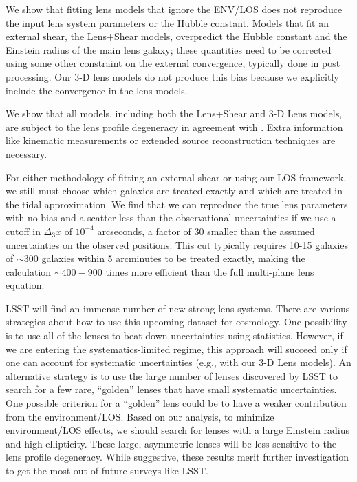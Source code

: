 \documentclass{emulateapj}
\begin{document}
We show that fitting lens models that ignore the ENV/LOS does not reproduce the input lens system parameters or the Hubble constant. Models that fit an external shear, the Lens+Shear models, overpredict the Hubble constant and the Einstein radius of the main lens galaxy; these quantities need to be corrected using some other constraint on the external convergence, typically done in post processing. Our 3-D lens models do not produce this bias because we explicitly include the convergence in the lens models.

We show that all models, including both the Lens+Shear and 3-D Lens models, are subject to the lens profile degeneracy in agreement with \citet{Xu15,Schneider13}. Extra information like kinematic measurements or extended source reconstruction techniques are necessary.

For either methodology of fitting an external shear or using our LOS framework, we still must choose which galaxies are treated exactly and which are treated in the tidal approximation. We find that we can reproduce the true lens parameters with no bias and a scatter less than the observational uncertainties if we use a cutoff in $\Delta_3 x$ of $10^{-4}$ arcseconds, a factor of 30 smaller than the assumed uncertainties on the observed positions. This cut typically requires 10-15 galaxies of $\sim 300$ galaxies within 5 arcminutes to be treated exactly, making the calculation $\sim 400-900$ times more efficient than the full multi-plane lens equation.

LSST will find an immense number of new strong lens systems. There are various strategies about how to use this upcoming dataset for cosmology. One possibility is to use all of the lenses to beat down uncertainties using statistics. However, if we are entering the systematics-limited regime, this approach will succeed only if one can account for systematic uncertainties (e.g., with our 3-D Lens models). An alternative strategy is to use the large number of lenses discovered by LSST to search for a few rare, ``golden'' lenses that have small systematic uncertainties. One possible criterion for a ``golden'' lens could be to have a weaker contribution from the environment/LOS. Based on our analysis, to minimize environment/LOS effects, we should search for lenses with a large Einstein radius and high ellipticity. These large, asymmetric lenses will be less sensitive to the lens profile degeneracy. While suggestive, these results merit further investigation to get the most out of future surveys like LSST.
\end{document}
